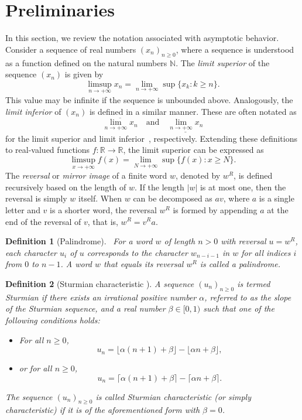\documentclass[12pt]{amsart}
\newtheorem{definition}{Definition}
\begin{document}
 \section{Preliminaries}\label{sec2}
In this section, we review the notation associated with asymptotic behavior. Consider a sequence of real numbers $(x_n)_{n \geq 0}$, where a sequence is understood as a function defined on the natural numbers $\mathbb{N}$. The \emph{limit superior} of the sequence $(x_n)$ is given by
\[
\limsup_{n \to +\infty} x_n = \lim_{n \to +\infty} \sup \{ x_k : k \geq n \}.
\]
This value may be infinite if the sequence is unbounded above. Analogously, the \emph{limit inferior} of $(x_n)$ is defined in a similar manner. These are often notated as
\[
\overline{\lim_{n \to +\infty} x_n} \quad \text{and} \quad \underline{\lim_{n \to +\infty} x_n}
\]
for the limit superior and limit inferior~\cite{Rigo2014}, respectively. Extending these definitions to real-valued functions $f : \mathbb{R} \to \mathbb{R}$, the limit superior can be expressed as
\[
\limsup_{x \to +\infty} f(x) = \lim_{N \to +\infty} \sup \{ f(x) : x \geq N \}.
\]
The \emph{reversal} or \emph{mirror image} of a finite word $w$, denoted by $w^R$, is defined recursively based on the length of $w$. If the length $|w|$ is at most one, then the reversal is simply $w$ itself. When $w$ can be decomposed as $a v$, where $a$ is a single letter and $v$ is a shorter word, the reversal $w^R$ is formed by appending $a$ at the end of the reversal of $v$, that is, $w^R = v^R a$.
\begin{definition}[Palindrome\cite{Rigo2014}]~\label{defffPalindromen1}
For a word $w$ of length $n>0$ with reversal $u=w^R$, each character $u_i$ of $u$ corresponds to the character $w_{n - i -1}$ in $w$ for all indices $i$ from $0$ to $n-1$. A word $w$ that equals its reversal $w^R$ is called a \emph{palindrome}.
\end{definition}


\begin{definition}[Sturmian characteristic \cite{Adamczewski2007}]\label{deffSturmiann1}
A sequence $(u_n)_{n \geq 0}$ is termed \emph{Sturmian} if there exists an irrational positive number $\alpha$, referred to as the slope of the Sturmian sequence, and a real number $\beta \in [0,1)$ such that one of the following conditions holds:
\begin{itemize}
    \item For all $n \geq 0$, 
    \[
    u_n = \lfloor \alpha (n+1) + \beta \rfloor - \lfloor \alpha n + \beta \rfloor,
    \]
    \item or for all $n \geq 0$, 
    \[
    u_n = \lceil \alpha (n+1) + \beta \rceil - \lceil \alpha n + \beta \rceil.
    \]
\end{itemize}
The sequence $(u_n)_{n \geq 0}$ is called \emph{Sturmian characteristic} (or simply \emph{characteristic}) if it is of the aforementioned form with $\beta = 0$.
\end{definition}
\end{document}
